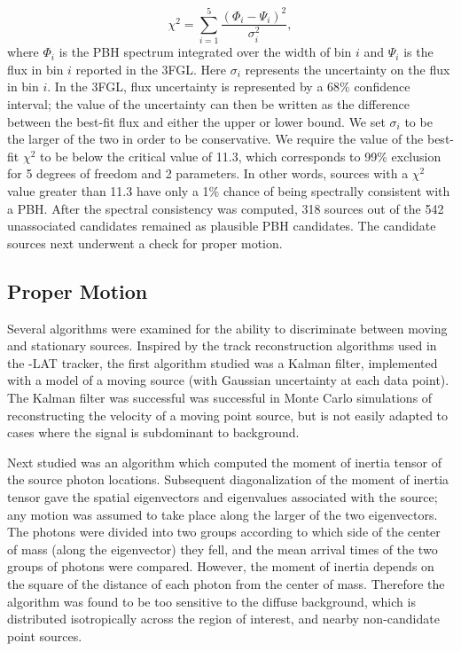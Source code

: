 \noindent
\begin{equation}
\chi^2 = \sum_{i = 1}^{5} \frac{(\Phi_i-\Psi_i )^2}{\sigma_i^2}, 
\end{equation}
where $\Phi_i$ is the PBH spectrum integrated over the width of bin $i$ and $\Psi_i$ is the flux in bin $i$ reported in the 3FGL. Here $\sigma_i$ represents the uncertainty on the flux in bin $i$.
In the 3FGL, flux uncertainty is represented by a 68\% confidence interval; the value of the uncertainty can then be written as the difference between the best-fit flux and either the upper or lower bound.
We set $\sigma_i$ to be the larger of the two in order to be conservative.
We require the value of the best-fit $\chi^2$ to be below the critical value of 11.3, which corresponds to 99\% exclusion for 5 degrees of freedom and 2 parameters. In other words, sources with a $\chi ^2$ value greater than 11.3 have only a 1\% chance of being spectrally consistent with a PBH. After the spectral consistency was computed, 318 sources out of the 542 unassociated candidates remained as plausible PBH candidates.
The candidate sources next underwent a check for proper motion. 

\subsection{Proper Motion}\label{sec:propmotion}
Several algorithms were examined for the ability to discriminate between moving and stationary sources.
Inspired by the track reconstruction algorithms used in the \Fermi-LAT tracker, the first algorithm studied was a Kalman filter, implemented with a model of a moving source (with Gaussian uncertainty at each data point). 
The Kalman filter was successful was successful in Monte Carlo simulations of reconstructing the velocity of a moving point source, but is not easily adapted to cases where the signal is subdominant to background.

Next studied was an algorithm which computed the moment of inertia tensor of the source photon locations.
Subsequent diagonalization of the moment of inertia tensor gave the spatial eigenvectors and eigenvalues associated with the source; any motion was assumed to take place along the larger of the two eigenvectors.
The photons were divided into two groups according to which side of the center of mass (along the eigenvector) they fell, and the mean arrival times of the two groups of photons were compared.
However, the moment of inertia depends on the square of the distance of each photon from the center of mass.
Therefore the algorithm was found to be too sensitive to the diffuse background, which is distributed isotropically across the region of interest, and nearby non-candidate point sources.

